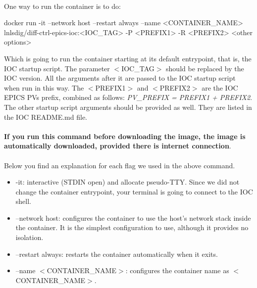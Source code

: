 \documentclass[openany]{article}
\begin{document}
        \paragraph{} One way to run the container is to do:

        \vspace{1mm}
        \begin{code}
docker run -it --network host --restart always --name <CONTAINER_NAME> lnlsdig/diff-ctrl-epics-ioc:<IOC_TAG> -P <PREFIX1> -R <PREFIX2> <other options>
        \end{code}
        \vspace{1mm}

        Which is going to run the container starting at its default entrypoint, that is, the IOC startup script. The parameter $<$IOC\_TAG$>$ should be replaced by the IOC version. All the arguments after it are passed to the IOC startup script when run in this way. The $<$PREFIX1$>$ and $<$PREFIX2$>$ are the IOC EPICS PVs prefix, combined as follows: \emph{PV\_PREFIX = PREFIX1 + PREFIX2}. The other startup script arguments should be provided as well. They are listed in the IOC README.md file.

        \paragraph{} \textbf{If you run this command before downloading the image, the image is automatically downloaded, provided there is internet connection}.

        \paragraph{} Below you find an explanation for each flag we used in the above command.

        \begin{itemize}
          \item -it: interactive (STDIN open) and allocate pseudo-TTY. Since we did not change the container entrypoint, your terminal is going to connect to the IOC shell.
          \item --network host: configures the container to use the host's network stack inside the container. It is the simplest configuration to use, although it provides no isolation.
          \item --restart always: restarts the container automatically when it exits.
          \item --name $<$CONTAINER\_NAME$>$: configures the container name as $<$CONTAINER\_NAME$>$.
        \end{itemize}
\end{document}
